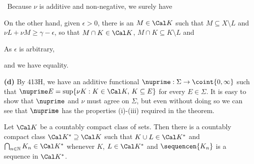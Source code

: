 {

\noindent\Prf\ Because $\nu$ is additive and non-negative, we surely
have


\noindent On the other hand, given $\epsilon>0$, there is an $M\in\Cal
K$ such that $M\subseteq X\setminus L$ and
$\nu L+\nu M\ge\gamma-\epsilon$, so that $M\cap K\in\Cal K$,
$M\cap K\subseteq K\setminus L$
and


\noindent As $\epsilon$ is arbitrary,


\noindent and we have equality.\ \Qed

\medskip

{\bf (d)} By 413H, we have an additive functional
$\nuprime:\Sigma\to\coint{0,\infty}$ such that
$\nuprime E=\sup\{\nu K:K\in\Cal K,\,K\subseteq E\}$ for every $E\in\Sigma$.
It is easy to show that
$\nuprime$ and $\nu$ must agree on $\Sigma$, but even without doing so we
can see that
$\nuprime$ has the properties (i)-(iii) required in the theorem.
}%

 Let $\Cal K$ be a
countably compact class of sets.
Then there is a countably compact class $\Cal K^*\supseteq\Cal K$ such
that $K\cup L\in\Cal K^*$ and $\bigcap_{n\in\Bbb N}K_n\in\Cal K^*$ whenever $K$, $L\in\Cal K^*$ and $\sequencen{K_n}$ is a sequence in $\Cal K^*$.


